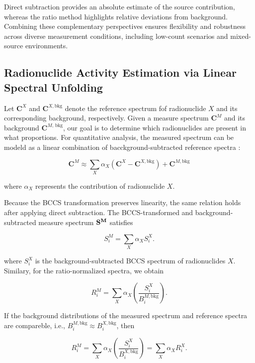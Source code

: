 \documentclass[10pt]{wlscirep}
\begin{document}
Direct subtraction provides an absolute estimate of the source contribution, whereas the ratio method highlights relative deviations from background. Combining these complementary perspectives ensures flexibility and robustness across diverse measurement conditions, including low-count scenarios and mixed-source environments.

\subsection*{Radionuclide Activity Estimation via Linear Spectral Unfolding}

Let $\textbf{C}^X$ and $\textbf{C}^{X,\text{bkg}}$ denote the reference spectrum fof radionuclide $X$ and its corresponding background, respectively. Given a measure spectrum $\textbf{C}^M$ and its background $\textbf{C}^{M,\,\text{bkg}}$, our goal is to determine which radionuclides are present in what proportions. For quantitative analysis, the measured spectrum can be modeld as a linear combination of bacckground-subtracted reference spectra :

\begin{equation}
\textbf{C}^M \approx \sum_{X} \alpha_X (\textbf{C}^{X} - \textbf{C}^{X,\text{bkg}}) + \textbf{C}^{M,\textrm{bkg}}
\end{equation}

\noindent where $\alpha_X$ represents the contribution of radionuclide $X$. 

Because the BCCS transformation preserves linearity, the same relation holds after applying direct subtraction. The BCCS-transformed and background-subtracted measure spectrum $\bf{S}^M$ satisfies

\begin{equation}
S_i^M = \sum_X \alpha_X S_i^X.\label{eq:submethod}
\end{equation}

where $S^X_i$ is the background-subtracted BCCS spectrum of radionuclides $X$. Similary, for the ratio-normalized spectra, we obtain

\begin{equation*}
R_i^M = \sum_X \alpha_X \left(\dfrac{S_i^X}{B_i^{M,\text{bkg}}}\right).
\end{equation*}

If the background distributions of the measured spectrum and reference spectra are compareble, i.e., $B^{M,\text{bkg}}_i \approx B_i^{X,\text{bkg}}$, then

\begin{equation}
R_i^M = \sum_X \alpha_X \left(\dfrac{S_i^X}{B_i^{X,\text{bkg}}}\right) = \sum_X \alpha_X R_i^X.\label{eq:ratiomethod}
\end{equation}
\end{document}
